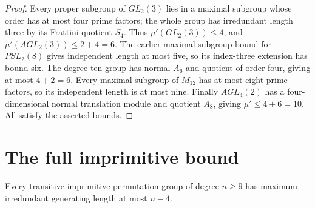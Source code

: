 \begin{proof}
Every proper subgroup of $GL_2(3)$ lies in a maximal subgroup whose
order has at most four prime factors; the whole group has irredundant
length three by its Frattini quotient $S_4$. Thus $\mu'(GL_2(3))\leq4$,
and $\mu'(AGL_2(3))\leq2+4=6$. The earlier maximal-subgroup bound
for $PSL_2(8)$ gives independent length at most five, so its index-three
extension has bound six. The degree-ten group has normal $A_6$ and
quotient of order four, giving at most $4+2=6$. Every maximal subgroup
of $M_{12}$ has at most eight prime factors, so its independent length
is at most nine. Finally $AGL_4(2)$ has a four-dimensional normal
translation module and quotient $A_8$, giving $\mu'\leq4+6=10$.
All satisfy the asserted bounds.
\end{proof}

\section{The full imprimitive bound}
\begin{theorem}\label{thm:imprimitive}
Every transitive imprimitive permutation group of degree $n\geq9$
has maximum irredundant generating length at most $n-4$.
\end{theorem}
